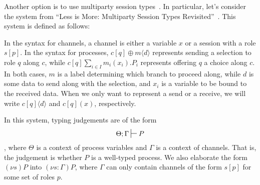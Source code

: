 \documentclass{article}
\theoremstyle{definition}
\newcommand{\proves}[1][]{\sststile{}{#1}}
\begin{document}
Another option is to use multiparty session types~\citep{ScalasY19}.
In particular, let's consider the system from ``Less is More: Multiparty Session Types Revisited''~\citep{ScalasY19}.
This system is defined as follows:
\begin{syntax}
    
     
    
\end{syntax}
In the syntax for channels, a channel is either a variable $x$ or a session with a role $s[p]$.
In the syntax for processes, $c[q]\oplus m\langle d\rangle$ represents sending a selection to role $q$ along $c$, while $c[q]\sum_{i \in I} m_i(x_i).P_i$ represents offering $q$ a choice along $c$.
In both cases, $m$ is a label determining which branch to proceed along, while $d$ is some data to send along with the selection, and $x_i$ is a variable to be bound to the received data.
When we only want to represent a send or a receive, we will write $c[q]\langle d \rangle$ and $c[q](x)$, respectively.

In this system, typing judgements are of the form $$\Theta; \Gamma \proves P$$, where $\Theta$ is a context of process variables and $\Gamma$ is a context of channels.
That is, the judgement is whether $P$ is a well-typed process.
We also elaborate the form $(\nu s) P$ into $(\nu s : \Gamma) P$, where $\Gamma$ can only contain channels of the form $s[p]$ for some set of roles $p$.
\end{document}
